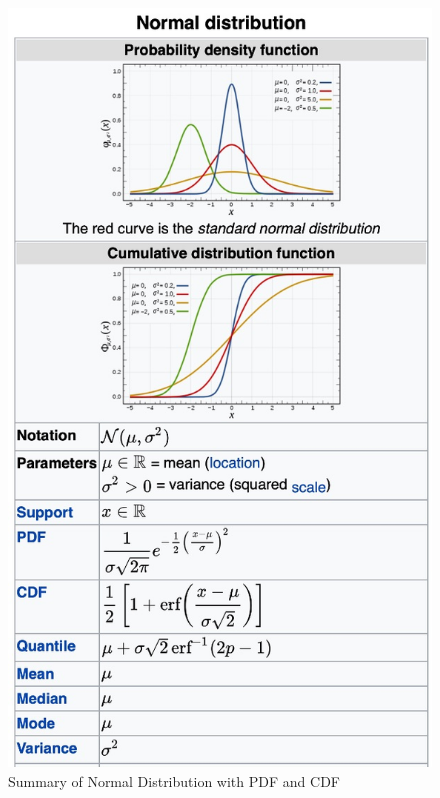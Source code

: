 \documentclass[
  12 pt,
  a4paper,
]{book}
\numberwithin{equation}{section}
\theoremstyle{plain}      %
\theoremstyle{definition} %
\theoremstyle{remark}     %
\theoremstyle{note}         %
\begin{document}
\begin{figure}[htbp]
    \centering
    \begin{minipage}[t]{0.55\textwidth}
        \centering
        \includegraphics[width=\textwidth]{pictures/normal_distribution.jpeg}
        \caption{Summary of Normal Distribution with PDF and CDF}
    \end{minipage}
    \hfill

\end{figure}
\end{document}
